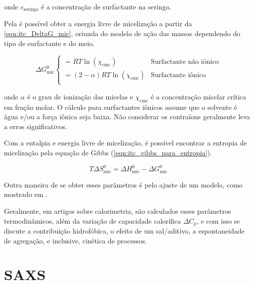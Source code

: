 		\noindent onde \(c_{\mathrm{seringa}}\) é a concentração de surfactante na seringa.
		
		Pela \cmc{} é possível obter a energia livre de micelização a partir da \autoref{eqn:itc_DeltaG_mic}, oriunda do modelo de ação das massas\cite{Loh2016} dependendo do tipo de surfactante e do meio.
		
		\begin{equation}
			\Delta G_{\textrm{mic}}^0
			\begin{cases}
			= RT\ln(\chi_{\textrm{cmc}})      & \textrm{Surfactante não iônico}      \\
			= (2-\alpha)RT\ln(\chi_{\textrm{cmc}}) & \textrm{Surfactante iônico}					\\
			\end{cases}
			\label{eqn:itc_DeltaG_mic}
		\end{equation} 
		
		\noindent onde \(\alpha\) é o grau de ionização das micelas e \(\chi_{\mathrm{cmc}}\) é a concentração micelar crítica em fração molar. O cálculo para surfactantes iônicos assume que o solvente é água e/ou a força iônica seja baixa. Não considerar os contraíons geralmente leva a erros significativos.\cite{Bouchemal2010a}
		
		Com a entalpia e energia livre de micelização, é possível encontrar a entropia de micelização pela equação de Gibbs (\autoref{eqn:itc_gibbs_para_entropia}).
		
		\begin{equation}
			T\Delta S^0_{\textrm{mic}} = \Delta H^0_{\textrm{mic}} - \Delta G^0_{\textrm{mic}}
			\label{eqn:itc_gibbs_para_entropia}
		\end{equation}
		
		Outra maneira de se obter esses parâmetros é pelo ajuste de um modelo, como mostrado em \citeauthor{Sarac2017a}.
		
		Geralmente, em artigos sobre calorimetria, são calculados esses parâmetros termodinâmicos, além da variação de capacidade calorífica \(\Delta C_p\), e com isso se discute a contribuição hidrofóbica\cite{Sarac2017a, Kfouri2019}, o efeito de um sal/aditivo\cite{Sarac2009, Liu2011a, Ito2016}, a espontaneidade de agregação\cite{Ito2016}, e inclusive, cinética de processos.\cite{Kfouri2019,Lof2007a}
		
	\chapter{SAXS}  
